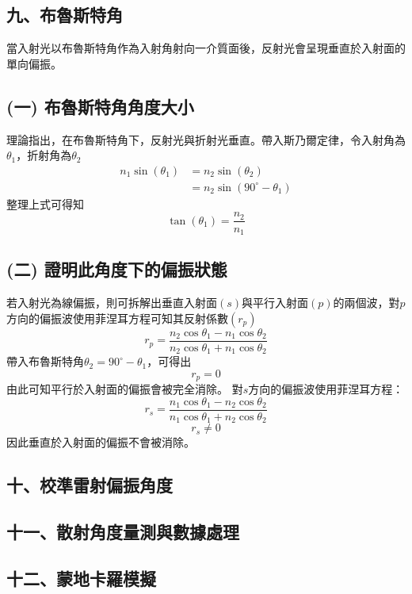 \subsection*{九、布魯斯特角}
當入射光以布魯斯特角作為入射角射向一介質面後，反射光會呈現垂直於入射面的單向偏振。

\subsection*{(一) 布魯斯特角角度大小}
理論指出，在布魯斯特角下，反射光與折射光垂直。帶入斯乃爾定律，令入射角為$\theta_1$，折射角為$\theta_2$
\begin{align}
    n_1\sin\left(\theta_1\right)&= n_2\sin\left(\theta_2\right)\\
    &= n_2\sin\left(90^\circ-\theta_1\right)
\end{align}
整理上式可得知
\begin{equation}
    \tan\left(\theta_1\right) = \frac{n_2}{n_1}
\end{equation}

\subsection*{(二) 證明此角度下的偏振狀態}
若入射光為線偏振，則可拆解出垂直入射面\((s)\)與平行入射面$(p)$的兩個波，對$p$方向的偏振波使用菲涅耳方程\parencite{born1999Principles,hecht2017Optics}可知其反射係數$(r_{p})$
\begin{equation}
    r_{p}=\frac{n_{2}\cos \theta _{1}-n_{1}\cos \theta _{2}}{n_{2}\cos \theta _{1}+n_{1}\cos \theta _{2}}
\end{equation}
帶入布魯斯特角$\theta_2 = 90^\circ-\theta_1$，可得出
\begin{equation}
    r_{p} = 0
\end{equation}
由此可知平行於入射面的偏振會被完全消除。
對$s$方向的偏振波使用菲涅耳方程：
\begin{equation}
r_{s}=\frac{n_{1}\cos \theta _{1}-n_{2}\cos \theta _{2}}{n_{1}\cos \theta _{1}+n_{2}\cos \theta _{2}} 
\end{equation}
\begin{equation}
    r_s \neq 0
\end{equation}
因此垂直於入射面的偏振不會被消除。

\subsection*{十、校準雷射偏振角度}


\subsection*{十一、散射角度量測與數據處理}



\subsection*{十二、蒙地卡羅模擬}
